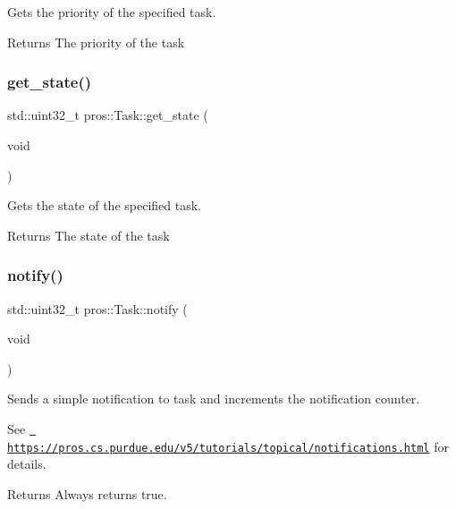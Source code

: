 Gets the priority of the specified task. 

\begin{DoxyReturn}{Returns}
The priority of the task 
\end{DoxyReturn}
\mbox{\label{classpros_1_1Task_a45f0b63eec57e7fe8adf3876988588bf}} 
\subsubsection{\texorpdfstring{get\_state()}{get\_state()}}
{\footnotesize\ttfamily std\+::uint32\+\_\+t pros\+::\+Task\+::get\+\_\+state (\begin{DoxyParamCaption}\item[{void}]{ }\end{DoxyParamCaption})}



Gets the state of the specified task. 

\begin{DoxyReturn}{Returns}
The state of the task 
\end{DoxyReturn}
\mbox{\label{classpros_1_1Task_ad376e3065701ba4853d4be1c90c0544c}} 
\subsubsection{\texorpdfstring{notify()}{notify()}}
{\footnotesize\ttfamily std\+::uint32\+\_\+t pros\+::\+Task\+::notify (\begin{DoxyParamCaption}\item[{void}]{ }\end{DoxyParamCaption})}



Sends a simple notification to task and increments the notification counter. 

See \href{https://pros.cs.purdue.edu/v5/tutorials/topical/notifications.html}{\texttt{ https\+://pros.\+cs.\+purdue.\+edu/v5/tutorials/topical/notifications.\+html}} for details.

\begin{DoxyReturn}{Returns}
Always returns true. 
\end{DoxyReturn}
\mbox{\label{classpros_1_1Task_a6fc6c97f2dd9fc92b6b9ff47557f215f}} 

